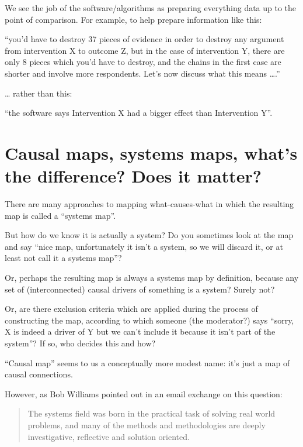 \documentclass[
]{book}
\begin{document}
We see the job of the software/algorithms as preparing everything data up to the point of comparison. For example, to help prepare information like this:

``you'd have to destroy 37 pieces of evidence in order to destroy any argument from intervention X to outcome Z, but in the case of intervention Y, there are only 8 pieces which you'd have to destroy, and the chains in the first case are shorter and involve more respondents. Let's now discuss what this means \ldots.''

\ldots{} rather than this:

``the software says Intervention X had a bigger effect than Intervention Y''.

\hypertarget{causal-maps-systems-maps-whats-the-difference-does-it-matter}{%
\chapter{Causal maps, systems maps, what's the difference? Does it matter?}\label{causal-maps-systems-maps-whats-the-difference-does-it-matter}}

There are many approaches to mapping what-causes-what in which the resulting map is called a ``systems map''.

But how do we know it is actually a system? Do you sometimes look at the map and say ``nice map, unfortunately it isn't a system, so we will discard it, or at least not call it a systems map''?

Or, perhaps the resulting map is always a systems map by definition, because any set of (interconnected) causal drivers of something is a system? Surely not?

Or, are there exclusion criteria which are applied during the process of constructing the map, according to which someone (the moderator?) says ``sorry, X is indeed a driver of Y but we can't include it because it isn't part of the system''? If so, who decides this and how?

``Causal map'' seems to us a conceptually more modest name: it's just a map of causal connections.

However, as Bob Williams pointed out in an email exchange on this question:

\begin{quote}
The systems field was born in the practical task of solving real world problems, and many of the methods and methodologies are deeply investigative, reflective and solution oriented.
\end{quote}
\end{document}
